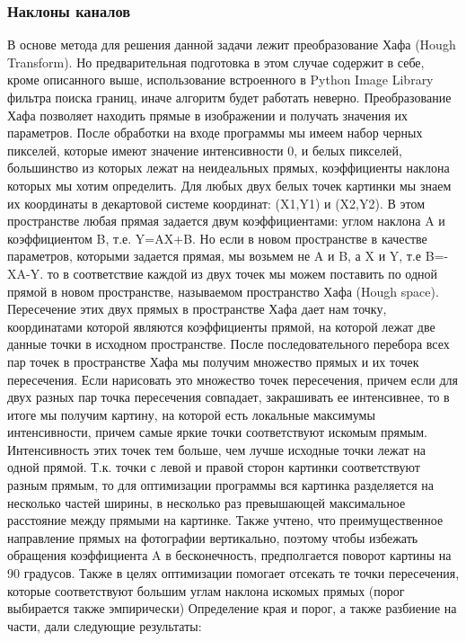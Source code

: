 \documentclass[letterpaper,10pt,russian]{/usr/lib/python3.3/site-packages/sphinx/texinputs/sphinxhowto}
\begin{document}
\subsubsection{Наклоны каналов}
В основе метода для решения данной задачи лежит преобразование Хафа
(Hough Transform). Но предварительная подготовка в этом случае содержит
в себе, кроме описанного выше, использование встроенного в Python Image
Library фильтра поиска границ, иначе алгоритм будет работать неверно. Преобразование Хафа позволяет находить прямые в изображении и получать
значения их параметров. После обработки на входе программы мы имеем
набор черных пикселей, которые имеют значение интенсивности 0, и белых
пикселей, большинство из которых лежат на неидеальных прямых,
коэффициенты наклона которых мы хотим определить. Для любых двух белых
точек картинки мы знаем их координаты в декартовой системе координат:
(X1,Y1) и (X2,Y2). В этом пространстве любая прямая задается двум
коэффициентами: углом наклона A и коэффициентом B, т.е. Y=AX+B. Но если
в новом пространстве в качестве параметров, которыми задается прямая, мы
возьмем не A и B, а X и Y, т.е B=-XA-Y. то в соответствие каждой из двух
точек мы можем поставить по одной прямой в новом пространстве,
называемом пространство Хафа (Hough space). Пересечение этих двух прямых
в пространстве Хафа дает нам точку, координатами которой являются
коэффициенты прямой, на которой лежат две данные точки в исходном
пространстве. После последовательного перебора всех пар точек в
пространстве Хафа мы получим множество прямых и их точек пересечения.
Если нарисовать это множество точек пересечения, причем если для двух
разных пар точка пересечения совпадает, закрашивать ее интенсивнее, то в
итоге мы получим картину, на которой есть локальные максимумы
интенсивности, причем самые яркие точки соответствуют искомым прямым.
Интенсивность этих точек тем больше, чем лучше исходные точки лежат на
одной прямой. Т.к. точки с левой и правой сторон картинки соответствуют
разным прямым, то для оптимизации программы вся картинка разделяется на
несколько частей ширины, в несколько раз превышающей максимальное
расстояние между прямыми на картинке. Также учтено, что преимущественное
направление прямых на фотографии вертикально, поэтому чтобы избежать
обращения коэффициента A в бесконечность, предполгается поворот картины
на 90 градусов. Также в целях оптимизации помогает отсекать те точки
пересечения, которые соответствуют большим углам наклона искомых прямых
(порог выбирается также эмпирически)
Определение края и порог, а также разбиение на части, дали следующие
результаты:
\FloatBarrier
\end{document}
